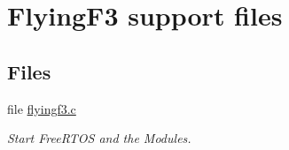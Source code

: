 \hypertarget{group___flying_f3}{\section{\-Flying\-F3 support files}
\label{group___flying_f3}
}
\subsection*{\-Files}
\begin{DoxyCompactItemize}
\item 
file \hyperlink{flyingf3_8c}{flyingf3.\-c}
\begin{DoxyCompactList}\small\item\em \-Start \-Free\-R\-T\-O\-S and the \-Modules. \end{DoxyCompactList}\end{DoxyCompactItemize}
